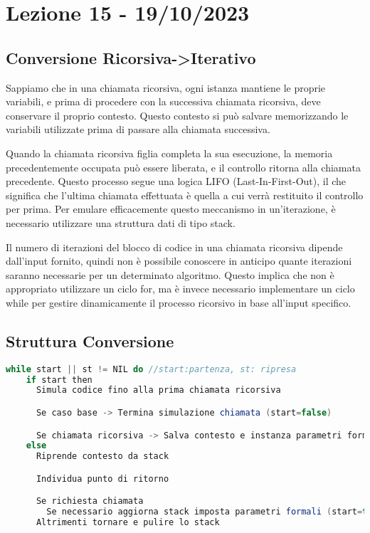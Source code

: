 \section{Lezione 15 - 19/10/2023}
\subsection{Conversione Ricorsiva->Iterativo}
Sappiamo che in una chiamata ricorsiva, ogni istanza mantiene le proprie variabili, e prima di procedere con la successiva chiamata ricorsiva, deve conservare il proprio contesto. Questo contesto si può salvare memorizzando le variabili utilizzate prima di passare alla chiamata successiva. 
\smallskip

Quando la chiamata ricorsiva figlia completa la sua esecuzione, la memoria precedentemente occupata può essere liberata, e il controllo ritorna alla chiamata precedente. Questo processo segue una logica LIFO (Last-In-First-Out), il che significa che l'ultima chiamata effettuata è quella a cui verrà restituito il controllo per prima. Per emulare efficacemente questo meccanismo in un'iterazione, è necessario utilizzare una struttura dati di tipo stack.
\smallskip

Il numero di iterazioni del blocco di codice in una chiamata ricorsiva dipende dall'input fornito, quindi non è possibile conoscere in anticipo quante iterazioni saranno necessarie per un determinato algoritmo. Questo implica che non è appropriato utilizzare un ciclo for, ma è invece necessario implementare un ciclo while per gestire dinamicamente il processo ricorsivo in base all'input specifico.
\subsection{Struttura Conversione}

\begin{lstlisting}[language=Java]
	while start || st != NIL do //start:partenza, st: ripresa
    if start then
      Simula codice fino alla prima chiamata ricorsiva

      Se caso base -> Termina simulazione chiamata (start=false)

      Se chiamata ricorsiva -> Salva contesto e instanza parametri formali
    else 
      Riprende contesto da stack

      Individua punto di ritorno

      Se richiesta chiamata
        Se necessario aggiorna stack imposta parametri formali (start=true)
      Altrimenti tornare e pulire lo stack
\end{lstlisting}

